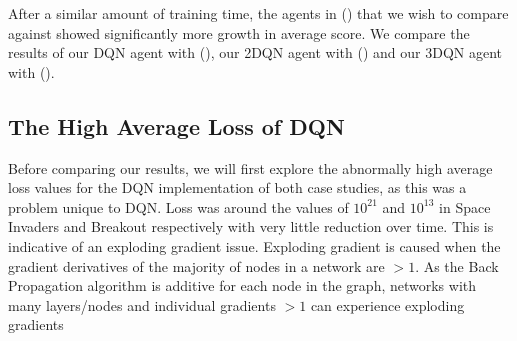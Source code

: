 After a similar amount of training time, the agents in (\citet{human,doubleq,dueling}) that we wish to compare against showed significantly more growth in average score. We compare the results of our DQN agent with (\citet{human}), our 2DQN agent with (\citet{doubleq}) and our 3DQN agent with (\citet{dueling}). \paragraph{}

\subsection{The High Average Loss of DQN} \label{sec:high_loss}
Before comparing our results, we will first explore the abnormally high average loss values for the DQN implementation of both case studies, as this was a problem unique to DQN. Loss was around the values of $10^{21}$ and $10^{13}$ in Space Invaders and Breakout respectively with very little reduction over time. This is indicative of an exploding gradient issue. Exploding gradient is caused when the gradient derivatives of the majority of nodes in a network are $>1$. As the Back Propagation algorithm is additive for each node in the graph, networks with many layers/nodes and individual gradients $>1$ can experience exploding gradients \paragraph{}

